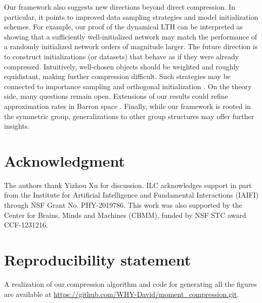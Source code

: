 \documentclass{article}
\theoremstyle{plain}
\begin{document}
Our framework also suggests new directions beyond direct compression. In particular, it points to improved data sampling strategies and model initialization schemes. For example, our proof of the dynamical LTH can be interpreted as showing that a sufficiently well-initialized network may match the performance of a randomly initialized network orders of magnitude larger. The future direction is to construct initializations (or datasets) that behave as if they were already compressed. Intuitively, well-chosen objects should be weighted and roughly equidistant, making further compression difficult. Such strategies may be connected to importance sampling \citep{hammersley2013monte, Bengio2008adaptive} and orthogonal initialization \citep{saxe2014exactsolutions}. On the theory side, many questions remain open. Extensions of our results could refine approximation rates in Barron space \citep{barron1994approximation, ma2022barron, yang2025optimal}. Finally, while our framework is rooted in the symmetric group, generalizations to other group structures may offer further insights.




\section*{Acknowledgment}
The authors thank Yizhou Xu for discussion. ILC acknowledges support in part from the Institute for Artificial Intelligence and Fundamental Interactions (IAIFI) through NSF Grant No. PHY-2019786. This work was also supported by the Center for Brains, Minds and Machines (CBMM), funded by NSF STC award  CCF-1231216.

\section*{Reproducibility statement}

A realization of our compression algorithm and code for generating all the figures are available at \url{https://github.com/WHY-David/moment_compression.git}. 



%


\end{document}
